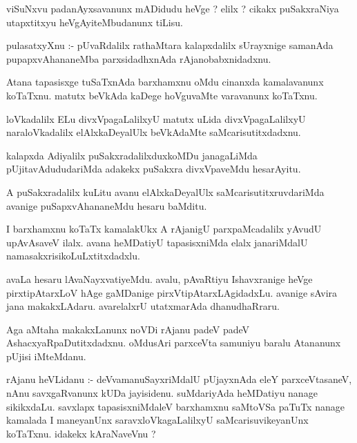 \documentclass{article}
\begin{document}
\begin{mn}
viSuNxvu  padanAyxsavanunx  mADidudu  heVge ?  elilx ?  cikakx puSakxraNiya  
utapxtitxyu  heVgAyiteMbudanunx  tiLisu.
\end{mn}

\begin{mn}
pulasatxyXnu :- pUvaRdalilx  rathaMtara  kalapxdalilx  sUrayxnige  samanAda  
pupapxvAhananeMba  parxsidadhxnAda  rAjanobabxnidadxnu.
\end{mn}

\begin{mn}
Atana tapasisxge  tuSaTxnAda  barxhamxnu  oMdu  cinanxda   kamalavanunx  koTaTxnu.  
matutx  beVkAda  kaDege  hoVguvaMte  varavanunx  koTaTxnu.
\end{mn}

\begin{mn}
loVkadalilx  ELu  divxVpagaLalilxyU  matutx  uLida  divxVpagaLalilxyU  naraloVkadalilx  
elAlxkaDeyalUlx  beVkAdaMte  saMcarisutitxdadxnu.
\end{mn}

\begin{mn}
kalapxda  Adiyalilx  puSakxradalilxduxkoMDu  janagaLiMda  pUjitavAdududariMda  adakekx  
puSakxra divxVpaveMdu  hesarAyitu.
\end{mn}

\begin{mn}
A  puSakxradalilx  kuLitu  avanu  elAlxkaDeyalUlx  saMcarisutitxruvdariMda  
avanige  puSapxvAhananeMdu  hesaru  baMditu.
\end{mn}

\begin{mn}
I  barxhamxnu  koTaTx  kamalakUkx  A  rAjanigU  parxpaMcadalilx  yAvudU  upAvAsaveV  ilalx.  
avana  heMDatiyU  tapasisxniMda  elalx  janariMdalU  namasakxrisikoLuLxtitxdadxlu.
\end{mn}

\begin{mn}
avaLa  hesaru  lAvaNayxvatiyeMdu.  avalu,  pAvaRtiyu  Ishavxranige  heVge  
pirxtipAtarxLoV  hAge  gaMDanige  pirxVtipAtarxLAgidadxLu.  avanige  sAvira  
jana  makakxLAdaru.  avarelalxrU  utatxmarAda  dhanudhaRraru.
\end{mn}

\begin{mn}
Aga  aMtaha  makakxLanunx  noVDi  rAjanu  padeV  padeV  AshacxyaRpaDutitxdadxnu.  
oMdusAri  parxceVta samuniyu  baralu  Atananunx  pUjisi  iMteMdanu.
\end{mn}

\begin{mn}
rAjanu  heVLidanu :- deVvamanuSayxriMdalU  pUjayxnAda  eleY  parxceVtasaneV,  nAnu  
savxgaRvanunx  kUDa  jayisidenu.  suMdariyAda  heMDatiyu  nanage  sikikxdaLu.  
savxlapx  tapasisxniMdaleV  barxhamxnu  saMtoVSa paTuTx  nanage  kamalada  I  
maneyanUnx  saravxloVkagaLalilxyU  saMcarisuvikeyanUnx  koTaTxnu.  idakekx  kAraNaveVnu ?
\end{mn}
\end{document}
